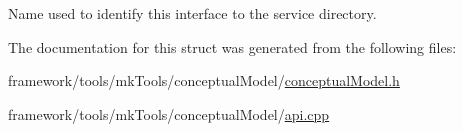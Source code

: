 Name used to identify this interface to the service directory. 



The documentation for this struct was generated from the following files\+:\begin{DoxyCompactItemize}
\item 
framework/tools/mk\+Tools/conceptual\+Model/\hyperlink{conceptual_model_8h}{conceptual\+Model.\+h}\item 
framework/tools/mk\+Tools/conceptual\+Model/\hyperlink{api_8cpp}{api.\+cpp}\end{DoxyCompactItemize}

